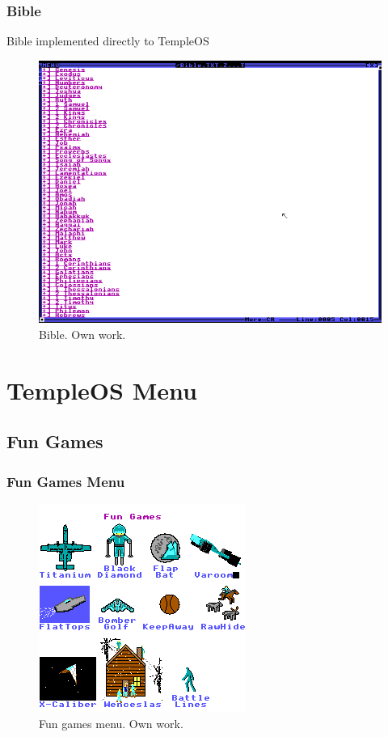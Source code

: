 \documentclass{beamer}
\begin{document}
	\begin{frame}
		\frametitle{Bible}
		Bible implemented directly to TempleOS
		\begin{figure}
			\centering
			\includegraphics[width=0.6\linewidth]{images/bible.png}
			\caption{Bible. Own work.}
			\label{fig:bible}
		\end{figure}
	\end{frame}

	\section[TOS Menu]{TempleOS Menu}
	\subsection{Fun Games}
	\begin{frame}
		\frametitle{Fun Games Menu}
		\begin{figure}
			\centering
			\includegraphics[width=0.6\linewidth]{images/fun_games.png}
			\caption{Fun games menu. Own work.}
			\label{fig:fun_games}
		\end{figure}
	\end{frame}
\end{document}
